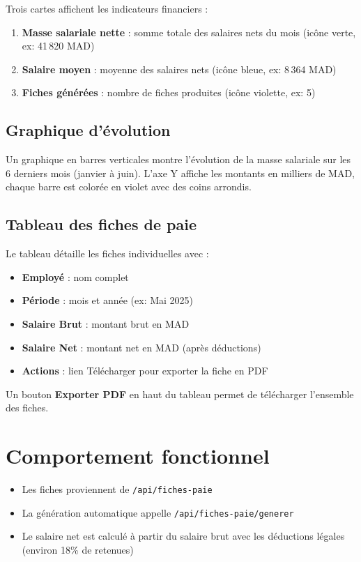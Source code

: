 \documentclass[12pt,a4paper]{report}
\begin{document}
Trois cartes affichent les indicateurs financiers :
\begin{enumerate}
    \item \textbf{Masse salariale nette} : somme totale des salaires nets du mois (icône verte, ex: 41\,820 MAD)
    \item \textbf{Salaire moyen} : moyenne des salaires nets (icône bleue, ex: 8\,364 MAD)
    \item \textbf{Fiches générées} : nombre de fiches produites (icône violette, ex: 5)
\end{enumerate}

\subsection{Graphique d'évolution}

Un graphique en barres verticales montre l'évolution de la masse salariale sur les 6 derniers mois (janvier à juin). L'axe Y affiche les montants en milliers de MAD, chaque barre est colorée en violet avec des coins arrondis.

\subsection{Tableau des fiches de paie}

Le tableau détaille les fiches individuelles avec :
\begin{itemize}
    \item \textbf{Employé} : nom complet
    \item \textbf{Période} : mois et année (ex: Mai 2025)
    \item \textbf{Salaire Brut} : montant brut en MAD
    \item \textbf{Salaire Net} : montant net en MAD (après déductions)
    \item \textbf{Actions} : lien \og Télécharger \fg{} pour exporter la fiche en PDF
\end{itemize}

Un bouton \textbf{Exporter PDF} en haut du tableau permet de télécharger l'ensemble des fiches.

\section{Comportement fonctionnel}

\begin{itemize}
    \item Les fiches proviennent de \texttt{/api/fiches-paie}
    \item La génération automatique appelle \texttt{/api/fiches-paie/generer}
    \item Le salaire net est calculé à partir du salaire brut avec les déductions légales (environ 18\% de retenues)
\end{itemize}
\end{document}
